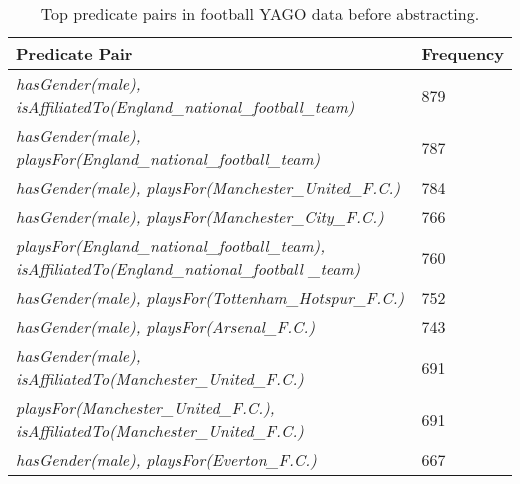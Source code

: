 \begin{table}[ht]
\caption{Top predicate pairs in football YAGO data before abstracting.}
\label{table5}
\begin{center}
\begin{tabular}{ |p{6cm}|p{1.5cm}| } 
\hline
Predicate Pair & Frequency\\
\hline
\textit{hasGender(male), isAffiliatedTo(England\_national\_football\_team)} & 879\\
\hline
\textit{hasGender(male), playsFor(England\_national\_football\_team)} & 787\\
\hline
\textit{hasGender(male), playsFor(Manchester\_United\_F.C.)} & 784\\
\hline
\textit{hasGender(male), playsFor(Manchester\_City\_F.C.)} & 766\\
\hline
\textit{playsFor(England\_national\_football\_team), isAffiliatedTo(England\_national\_football \_team)} & 760\\
\hline
\textit{hasGender(male), playsFor(Tottenham\_Hotspur\_F.C.)} & 752\\
\hline
\textit{hasGender(male), playsFor(Arsenal\_F.C.)} & 743\\
\hline
\textit{hasGender(male), isAffiliatedTo(Manchester\_United\_F.C.)} & 691\\
\hline
\textit{playsFor(Manchester\_United\_F.C.), isAffiliatedTo(Manchester\_United\_F.C.)} & 691\\
\hline
\textit{hasGender(male), playsFor(Everton\_F.C.)} & 667\\
\hline
\end{tabular}
\end{center}
\end{table}

